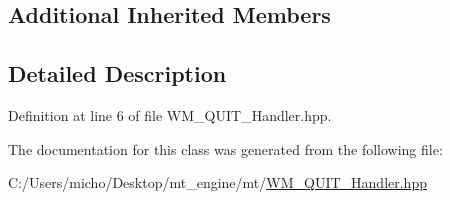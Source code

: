 \subsection*{Additional Inherited Members}


\subsection{Detailed Description}


Definition at line 6 of file W\+M\+\_\+\+Q\+U\+I\+T\+\_\+\+Handler.\+hpp.



The documentation for this class was generated from the following file\+:\begin{DoxyCompactItemize}
\item 
C\+:/\+Users/micho/\+Desktop/mt\+\_\+engine/mt/\hyperlink{_w_m___q_u_i_t___handler_8hpp}{W\+M\+\_\+\+Q\+U\+I\+T\+\_\+\+Handler.\+hpp}\end{DoxyCompactItemize}
